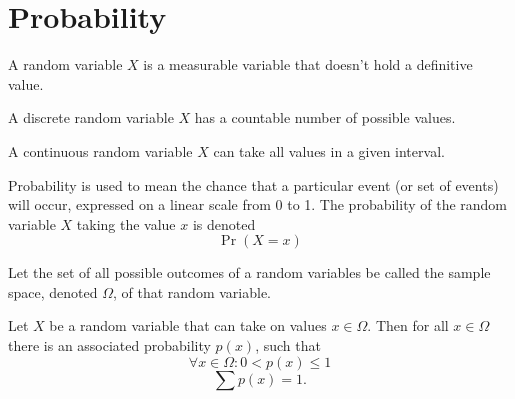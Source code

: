 \documentclass{article}
\begin{document}
\section{Probability}
\begin{definition}
    A random variable \(X\) is a measurable variable that doesn't hold a definitive value.
\end{definition}
\begin{definition}
    A discrete random variable \(X\) has a countable number of possible values.
\end{definition}
\begin{definition}
    A continuous random variable \(X\) can take all values in a given interval.
\end{definition}
\begin{definition}[Probability]
    Probability is used to mean the chance that a particular event
    (or set of events) will occur, expressed on a linear scale from 0 to 1.
    The probability of the random variable \(X\) taking the value \(x\) is denoted
    \begin{equation*}
        \Pr{\left( X = x \right)}
    \end{equation*}
\end{definition}
\begin{definition}
    Let the set of all possible outcomes of a random variables be called the sample
    space, denoted \(\Omega \), of that random variable.

    Let \(X\) be a random variable that can take on values \(x\in\Omega \). Then
    for all \(x\in\Omega \) there is an associated probability \(p(x)\), such that
    \begin{equation*}
        \forall x\in\Omega : 0 < p(x) \leq 1
    \end{equation*}
    \begin{equation*}
        \sum p(x) = 1.
    \end{equation*}
\end{definition}
\end{document}
